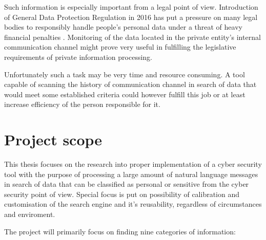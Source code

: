 \documentclass[a4paper,twoside,12pt]{book}
\begin{document}
Such information is especially important from a legal point of view. Introduction of General Data Protection
Regulation in 2016 has put a pressure on many legal bodies to responsibly handle people's personal data under
a threat of heavy financial penalties \cite{bib:bookRODO}. Monitoring of the data located in the private entity's internal communication
channel might prove very useful in fulfilling the legislative requirements of private information processing.

Unfortunately such a task may be very time and resource consuming. A tool capable of scanning the history of 
communication channel in search of data that would meet some established criteria could however fulfill this job or at least
increase efficiency of the person responsible for it.

\section{Project scope}

This thesis focuses on the research into proper implementation of a cyber security tool with the purpose of processing 
a large amount of natural language messages in search of data that can be classified as personal or sensitive from the cyber security
point of view. Special focus is put on possibility of calibration and customisation of the search engine and it's reusability, regardless of 
circumstances and enviroment.

The project will primarily focus on finding nine categories of information:
\end{document}
